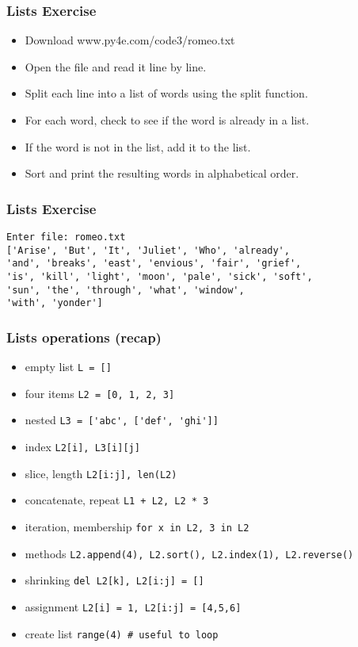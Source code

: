 \begin{frame}[fragile]\frametitle{Lists Exercise}
  \begin{itemize}
  \item Download www.py4e.com/code3/romeo.txt
  \item Open the file and read it line by line. 
  \item Split each line into a list of words using the split function.
  \item For each word, check to see if the word is already in a list. 
  \item If the word is not in the list, add it to the list.
  \item Sort and print the resulting words in alphabetical order.
  \end{itemize}
\end{frame}

\begin{frame}[fragile]\frametitle{Lists Exercise}
  \begin{lstlisting}
Enter file: romeo.txt
['Arise', 'But', 'It', 'Juliet', 'Who', 'already',
'and', 'breaks', 'east', 'envious', 'fair', 'grief',
'is', 'kill', 'light', 'moon', 'pale', 'sick', 'soft',
'sun', 'the', 'through', 'what', 'window',
'with', 'yonder']
  \end{lstlisting}
\end{frame}


\begin{frame}[fragile]\frametitle{Lists operations (recap)}
  \begin{itemize}
  \item empty list \lstinline{L = []}
  \item four items \lstinline{L2 = [0, 1, 2, 3]}
  \item nested \lstinline{L3 = ['abc', ['def', 'ghi']]}
  \item index \lstinline{L2[i], L3[i][j]}
  \item slice, length \lstinline{L2[i:j], len(L2)}
  \item concatenate, repeat \lstinline{L1 + L2, L2 * 3}
  \item iteration, membership \lstinline{for x in L2, 3 in L2}
  \item methods \lstinline{L2.append(4), L2.sort(), L2.index(1), L2.reverse()}
  \item shrinking \lstinline{del L2[k], L2[i:j] = []}
  \item assignment \lstinline{L2[i] = 1, L2[i:j] = [4,5,6]}
  \item create list \lstinline{range(4) # useful to loop}
  \end{itemize}
\end{frame}

